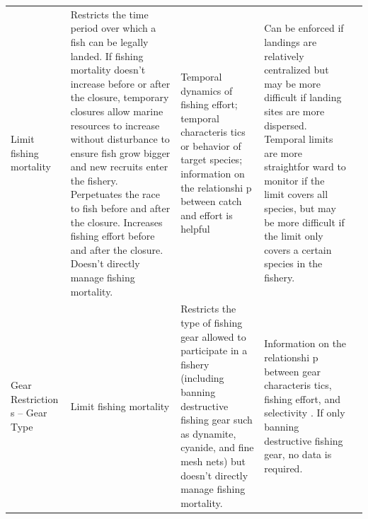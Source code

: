 \documentclass[]{book}
\begin{document}
\begin{longtable}[]{@{}lllll@{}}
\begin{minipage}[t]{0.17\columnwidth}
Limit fishing mortality\strut
\end{minipage} & \begin{minipage}[t]{0.17\columnwidth}\raggedright\strut
Restricts the time period over which a fish can be legally landed. If
fishing mortality doesn't increase before or after the closure,
temporary closures allow marine resources to increase without
disturbance to ensure fish grow bigger and new recruits enter the
fishery. Perpetuates the race to fish before and after the closure.
Increases fishing effort before and after the closure. Doesn't directly
manage fishing mortality.\strut
\end{minipage} & \begin{minipage}[t]{0.17\columnwidth}\raggedright\strut
Temporal dynamics of fishing effort; temporal characteris tics or
behavior of target species; information on the relationshi p between
catch and effort is helpful\strut
\end{minipage} & \begin{minipage}[t]{0.17\columnwidth}\raggedright\strut
Can be enforced if landings are relatively centralized but may be more
difficult if landing sites are more dispersed. Temporal limits are more
straightfor ward to monitor if the limit covers all species, but may be
more difficult if the limit only covers a certain species in the
fishery.\strut
\end{minipage}\tabularnewline
\begin{minipage}[t]{0.17\columnwidth}\raggedright\strut
Gear Restriction s -- Gear Type\strut
\end{minipage} & \begin{minipage}[t]{0.17\columnwidth}\raggedright\strut
Limit fishing mortality\strut
\end{minipage} & \begin{minipage}[t]{0.17\columnwidth}\raggedright\strut
Restricts the type of fishing gear allowed to participate in a fishery
(including banning destructive fishing gear such as dynamite, cyanide,
and fine mesh nets) but doesn't directly manage fishing mortality.\strut
\end{minipage} & \begin{minipage}[t]{0.17\columnwidth}\raggedright\strut
Information on the relationshi p between gear characteris tics, fishing
effort, and selectivity . If only banning destructive fishing gear, no
data is required.\strut
\end{minipage} & \begin{minipage}[t]{0.17\columnwidth}\raggedright\strut

\end{minipage}
\end{longtable}
\end{document}
